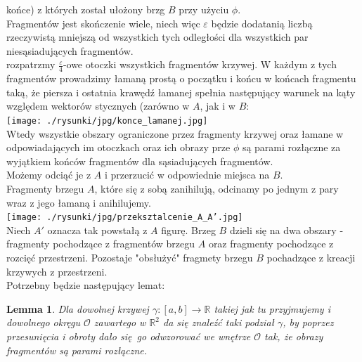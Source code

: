 \documentclass[a4paper, 12pt]{article}
\newtheorem{lemma}[observation]{Lemma}
\newcommand{\rysunek}[1]{\hfill \break\\[16pt] \Huge \textbf{\textcolor{violet}{Brakujący rysunek \normalsize
#1}} \hfill
\break \\[16pt] \normalsize}
\begin{document}
 końce) z których został ułożony brzg $B$ przy  użyciu $\phi$.  \\
Fragmentów jest skończenie wiele, niech więc $\varepsilon$ będzie dodatanią liczbą rzeczywistą mniejszą
od wszystkich tych odległości dla wszystkich par niesąsiadujących fragmentów. \\
rozpatrzmy $\frac{\varepsilon}{4}$-owe otoczki wszystkich fragmentów krzywej. W każdym z tych fragmentów
prowadzimy
łamaną prostą o początku i końcu w końcach fragmentu taką, że piersza i ostatnia krawędź łamanej
\label{180 stopni} spełnia
następujący warunek na kąty względem wektorów stycznych (zarówno w $A$, jak i w $B$: \\
\texttt{[image: ./rysunki/jpg/konce\_lamanej.jpg]} \\ %
Wtedy wszystkie obszary ograniczone przez fragmenty krzywej oraz łamane w odpowiadających im
otoczkach oraz ich obrazy prze $\phi$ są parami rozłączne za wyjątkiem końców fragmentów dla
sąsiadujących fragmentów. \\
Możemy odciąć je z $A$ i przerzucić w odpowiednie miejsca na $B$. \\
Fragmenty brzegu $A$, które się z sobą zanihilują, odcinamy po jednym z pary wraz z jego łamaną i
anihilujemy. \\
\texttt{[image: ./rysunki/jpg/przeksztalcenie\_A\_A'.jpg]} \\
Niech $A'$ oznacza tak powstałą z $A$ figurę.
Brzeg $B$ dzieli się na dwa obszary - fragmenty pochodzące z fragmentów brzegu $A$ oraz fragmenty
pochodzące z rozcięć przestrzeni.
Pozostaje "obsłużyć" fragmety brzegu $B$ pochadzące z kreacji krzywych z przestrzeni. \\
Potrzebny będzie następujący lemat:
\begin{lemma}\label{lemat o dzieleniu}
    Dla dowolnej krzywej $\gamma : [a, b] \to \mathbb{R}$ takiej jak tu przyjmujemy i dowolnego okręgu
    $\mathcal{O}$ zawartego w $\mathbb{R}^2$ da się znaleźć taki podział $\gamma$, by poprzez
    przesunięcia i obroty
    dało się go odwzorować we wnętrze $\mathcal{O}$ tak, że obrazy fragmentów są parami rozłączne.
\end{lemma}
\end{document}
